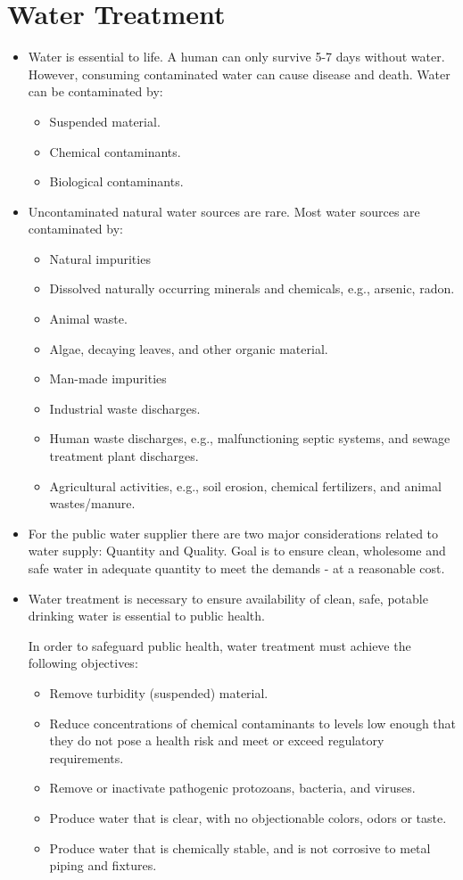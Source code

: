 \section{Water Treatment}
\begin{itemize}
\item Water is essential to life. A human can only survive 5-7 days without water. However, consuming contaminated water can cause disease and death. Water can be contaminated by:
\begin{itemize}
\item Suspended material.
\item Chemical contaminants.
\item Biological contaminants.
\end{itemize}
\item Uncontaminated natural water sources are rare. Most water sources are contaminated by:
\begin{itemize}
\item Natural impurities
\item Dissolved naturally occurring minerals and chemicals, e.g., arsenic, radon.
\item Animal waste.
\item Algae, decaying leaves, and other organic material.
\item Man-made impurities
\item Industrial waste discharges.
\item Human waste discharges, e.g., malfunctioning septic systems, and sewage treatment plant discharges.
\item Agricultural activities, e.g., soil erosion, chemical fertilizers, and animal wastes/manure.
\end{itemize}
\item For the public water supplier there are two major considerations related to water supply: Quantity and Quality.  Goal is to ensure clean, wholesome and safe water in adequate quantity to meet the demands - at a reasonable cost.

\item Water treatment is necessary to ensure availability of clean, safe, potable drinking water is essential to public health. 

In order to safeguard public health, water treatment must achieve the following objectives:
\begin{itemize}
\item Remove turbidity (suspended) material.
\item Reduce concentrations of chemical contaminants to levels low enough that they do not pose a health risk and meet or exceed regulatory requirements.
\item Remove or inactivate pathogenic protozoans, bacteria, and viruses.
\item Produce water that is clear, with no objectionable colors, odors or taste.
\item Produce water that is chemically stable, and is not corrosive to metal piping and fixtures.

\end{itemize}
\end{itemize}
